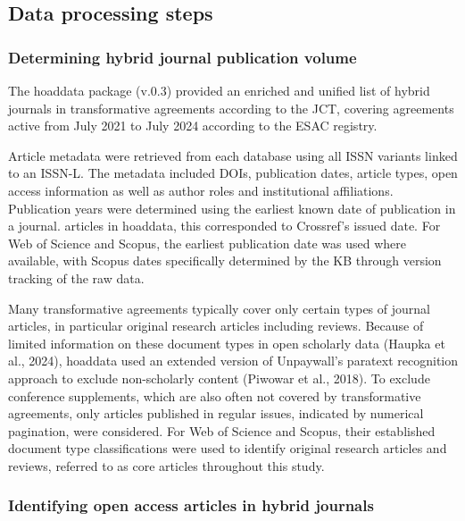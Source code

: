 \documentclass[a4paper,man,floatsintext,longtable,noextraspace,10pt]{apa6}
\begin{document}
\subsection{Data processing steps}\label{data-processing-steps}

\subsubsection{Determining hybrid journal publication
volume}\label{determining-hybrid-journal-publication-volume}

The hoaddata package (v.0.3) provided an enriched and unified list of
hybrid journals in transformative agreements according to the JCT,
covering agreements active from July 2021 to July 2024 according to the
ESAC registry.

Article metadata were retrieved from each database using all ISSN
variants linked to an ISSN-L. The metadata included DOIs, publication
dates, article types, open access information as well as author roles
and institutional affiliations. Publication years were determined using
the earliest known date of publication in a journal. articles in
hoaddata, this corresponded to Crossref's issued date. For Web of
Science and Scopus, the earliest publication date was used where
available, with Scopus dates specifically determined by the KB through
version tracking of the raw data.

Many transformative agreements typically cover only certain types of
journal articles, in particular original research articles including
reviews. Because of limited information on these document types in open
scholarly data (Haupka et al., 2024), hoaddata used an extended version
of Unpaywall's paratext recognition approach to exclude non-scholarly
content (Piwowar et al., 2018). To exclude conference supplements, which
are also often not covered by transformative agreements, only articles
published in regular issues, indicated by numerical pagination, were
considered. For Web of Science and Scopus, their established document
type classifications were used to identify original research articles
and reviews, referred to as core articles throughout this study.

\subsubsection{Identifying open access articles in hybrid
journals}\label{identifying-open-access-articles-in-hybrid-journals}
\end{document}
